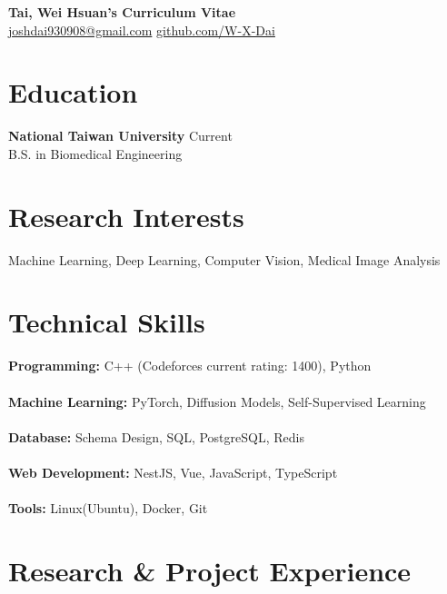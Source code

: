 \documentclass[11pt]{article}
\begin{document}

\begin{center}
{\Large \textbf{Tai, Wei Hsuan's Curriculum Vitae}} \\
\vspace{4pt}
\href{mailto:joshdai930908@gmail.com}{joshdai930908@gmail.com} \quad
\href{https://github.com/W-X-Dai}{github.com/W-X-Dai}
\end{center}

\vspace{10pt}


\section*{Education}

\textbf{National Taiwan University} \hfill Current \\
B.S. in Biomedical Engineering


\section*{Research Interests}

Machine Learning, Deep Learning, Computer Vision, Medical Image Analysis


\section*{Technical Skills}

\textbf{Programming:} C++ (Codeforces current rating: 1400), Python \\ \\
\textbf{Machine Learning:} PyTorch, Diffusion Models, Self-Supervised Learning \\ \\
\textbf{Database:} Schema Design, SQL, PostgreSQL, Redis \\ \\
\textbf{Web Development:} NestJS, Vue, JavaScript, TypeScript \\ \\
\textbf{Tools:} Linux(Ubuntu), Docker, Git

    
\section*{Research \& Project Experience}
\end{document}
